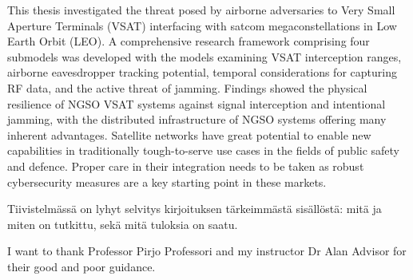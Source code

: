 \documentclass[english, 12pt, a4paper, elec, utf8, a-1b, online]{aaltothesis}
\begin{document}
\begin{abstractpage}[english]
  This thesis investigated the threat posed by airborne adversaries to Very Small Aperture Terminals (VSAT) interfacing with satcom megaconstellations in Low Earth Orbit (LEO). A comprehensive research framework comprising four submodels was developed with the models examining VSAT interception ranges, airborne eavesdropper tracking potential, temporal considerations for capturing RF data, and the active threat of jamming. Findings showed the physical resilience of NGSO VSAT systems against signal interception and intentional jamming, with the distributed infrastructure of NGSO systems offering many inherent advantages. Satellite networks have great potential to enable new capabilities in traditionally tough-to-serve use cases in the fields of public safety and defence. Proper care in their integration needs to be taken as robust cybersecurity measures are a key starting point in these markets.
\end{abstractpage}


\newpage

\begin{abstractpage}[finnish]
  Tiivistelmässä on lyhyt selvitys
  kirjoituksen tärkeimmästä sisällöstä: mitä ja miten on tutkittu,
  sekä mitä tuloksia on saatu. 
\end{abstractpage}


I want to thank Professor Pirjo Professori and my instructor Dr Alan Advisor for their good and poor guidance.\\
\end{document}
